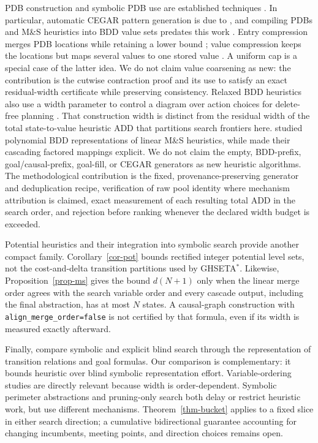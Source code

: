 \documentclass[letterpaper]{article}
\newcommand{\ghseta}{GHSETA\ensuremath{^{*}}}
\theoremstyle{plain}
\theoremstyle{definition}
\theoremstyle{remark}
\begin{document}
PDB construction and symbolic PDB use are established techniques
\citep{culberson-schaeffer-compint1998,edelkamp-ecp2001}. In particular,
automatic CEGAR pattern generation is due to
\citet{rovner-et-al-icaps2019}, and compiling PDBs and M\&S heuristics into
BDD value sets predates this work \citep{edelkamp-et-al-ecai2012}.
Entry compression merges PDB locations while retaining a lower bound
\citep{felner-et-al-jair2007}; value compression keeps the locations but maps
several values to one stored value \citep{sturtevant-et-al-aaai2017}. A
uniform cap is a special case of the latter idea. We do not claim value
coarsening as new: the contribution is the cutwise contraction proof and its
use to satisfy an exact residual-width certificate while preserving
consistency.
Relaxed BDD heuristics also use a width parameter to control a diagram over
action choices for delete-free planning \citep{castro-et-al-icaps2019}. That
construction width is distinct from the residual width of the total
state-to-value heuristic ADD that partitions search frontiers here.
\citet{torralba-phd2015} studied polynomial BDD representations of linear M\&S
heuristics, while \citet{helmert-et-al-icaps2015} made their cascading
factored mappings explicit. We do not claim the empty, BDD-prefix,
goal/causal-prefix, goal-fill, or CEGAR generators as new heuristic
algorithms. The methodological contribution is the fixed,
provenance-preserving generator and deduplication recipe, verification of raw
pool identity where mechanism attribution is claimed, exact measurement of
each resulting total ADD in the search order, and rejection before ranking
whenever the declared width budget is exceeded.

Potential heuristics \citep{pommerening-et-al-aaai2015} and their integration
into symbolic search \citep{fiser-et-al-aaai2022,fiser-et-al-aij2024} provide
another compact family. Corollary~\ref{cor-pot} bounds rectified integer
potential level sets, not the cost-and-delta transition partitions used by
\ghseta. Likewise, Proposition~\ref{prop-ms} gives the bound $d(N+1)$ only
when the linear merge order agrees with the search variable order and every
cascade output, including the final abstraction, has at most $N$ states. A causal-graph construction with
\texttt{align\_merge\_order=false} is not certified by that formula, even if
its width is measured exactly afterward.

Finally, \citet{speck-helmert-ecai2025} compare symbolic and explicit blind
search through the representation of transition relations and goal formulas.
Our comparison is complementary: it bounds heuristic over blind symbolic
representation effort. Variable-ordering studies
\citep{kissmann-hoffmann-jair2014} are directly relevant because width is
order-dependent. Symbolic perimeter abstractions
\citep{torralba-et-al-ijcai2016a,torralba-et-al-aij2018} and pruning-only
search both delay or restrict heuristic work, but use different mechanisms.
Theorem~\ref{thm-bucket} applies to a fixed slice in either search direction;
a cumulative bidirectional guarantee accounting for changing incumbents,
meeting points, and direction choices remains open.

\label{sec:supp-related-end}
\label{sec:supp-references-start}
{\small


}
\end{document}
